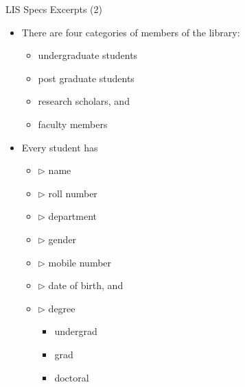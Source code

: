 \documentclass[aspectratio=169, xcolor=dvipsnames]{beamer}
\begin{document}
\begin{frame}{LIS Specs Excerpts (2)}
    \begin{itemize}[<+->]
        \item There are four categories of members of the library:
        \begin{itemize}
            \item[$\triangleright$] undergraduate students
            \item[$\triangleright$] post graduate students
            \item[$\triangleright$] research scholars, and
            \item[$\triangleright$] faculty members
        \end{itemize}
        \item Every student has
        \begin{itemize}
            \item $\triangleright$ name
            \item $\triangleright$ roll number
            \item $\triangleright$ department
            \item $\triangleright$ gender
            \item $\triangleright$ mobile number
            \item $\triangleright$ date of birth, and
            \item $\triangleright$ degree
            \begin{itemize}
                \item undergrad
                \item grad
                \item doctoral
            \end{itemize}
        \end{itemize}
    \end{itemize}
\end{frame}
\end{document}
